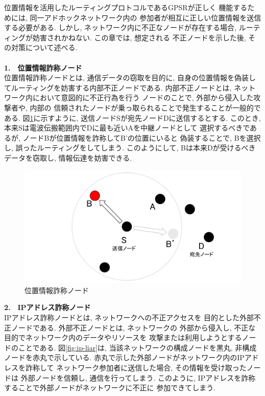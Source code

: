 位置情報を活用したルーティングプロトコルであるGPSRが正しく
機能するためには, 同一アドホックネットワーク内の
参加者が相互に正しい位置情報を送信する必要がある. 
しかし, ネットワーク内に不正なノードが存在する場合, 
ルーティングが妨害されかねない. この章では, 想定される 
不正ノードを示した後, その対策について述べる. \\

\\[0.5em]
\noindent \textbf{1.　位置情報詐称ノード}\\
\indent 位置情報詐称ノードとは, 通信データの窃取を目的に, 
自身の位置情報を偽装してルーティングを妨害する内部不正ノードである. 
内部不正ノードとは, ネットワーク内において意図的に不正行為を行う
ノードのことで, 外部から侵入した攻撃者や, 内部の
信頼されたノードが乗っ取られることで発生することが一般的である. 
図\ref{fig:position-liar}に示すように, 送信ノードSが宛先ノードDに送信するとする. 
このとき, 本来Sは電波伝搬範囲内でDに最も近いAを中継ノードとして
選択するべきであるが, ノードBが位置情報を詐称してB'の位置にいると
偽装することで, Bを選択し, 誤ったルーティングをしてしまう. 
このようにして, Bは本来Dが受けるべきデータを窃取し, 
情報伝達を妨害できる.

\begin{figure}
  \centering
  \includegraphics[scale=0.6]{figures/position-liar.png}
  \caption{位置情報詐称ノード}
  \label{fig:position-liar}
\end{figure}

\noindent \textbf{2.　IPアドレス詐称ノード}\\
\indent IPアドレス詐称ノードとは, ネットワークへの不正アクセスを
目的とした外部不正ノードである. 外部不正ノードとは, ネットワークの
外部から侵入し, 不正な目的でネットワーク内のデータやリソースを
攻撃または利用しようとするノードのことである. 図\ref{fig:ip-liar}は,  
当該ネットワークの構成ノードを黒丸, 非構成ノードを赤丸で示している. 
赤丸で示した外部ノードがネットワーク内のIPアドレスを詐称して
ネットワーク参加者に送信した場合, その情報を受け取ったノードは
外部ノードを信頼し, 通信を行ってしまう. このように, 
IPアドレスを詐称することで外部ノードがネットワークに不正に
参加できてしまう. 

